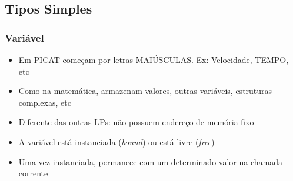 \subsection{Tipos Simples}
\begin{frame}
    \frametitle{Variável}
   
   \begin{itemize}
     \item Em PICAT começam por letras MAIÚSCULAS. Ex: Velocidade, TEMPO, etc
     \item Como na matemática, armazenam valores, outras variáveis, estruturas complexas, etc

     \item Diferente das outras LPs: não possuem endereço de memória fixo

     \item A variável está instanciada (\textit{bound}) ou está livre (\textit{free})
     \item Uma vez instanciada, permanece com um determinado valor na chamada corrente
     
   \end{itemize}
   
  
   
\end{frame}


